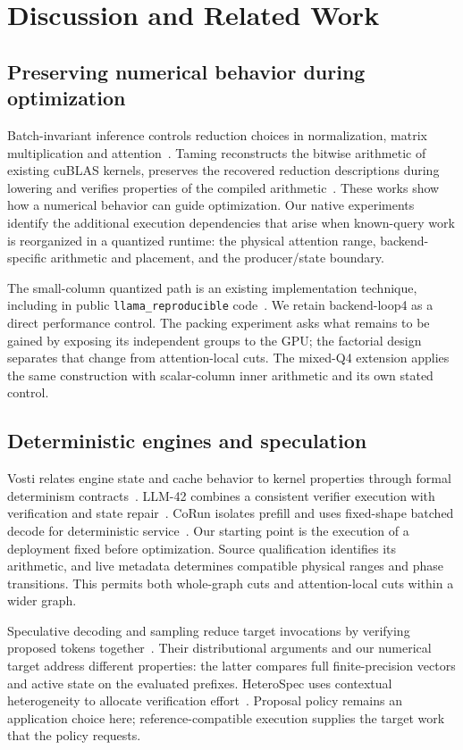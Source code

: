 \section{Discussion and Related Work}
\label{sec:related}
\subsection{Preserving numerical behavior during optimization}
Batch-invariant inference controls reduction choices in normalization, matrix multiplication and attention~\cite{thinkingmachines}. Taming reconstructs the bitwise arithmetic of existing cuBLAS kernels, preserves the recovered reduction descriptions during lowering and verifies properties of the compiled arithmetic~\cite{taming}. These works show how a numerical behavior can guide optimization. Our native experiments identify the additional execution dependencies that arise when known-query work is reorganized in a quantized runtime: the physical attention range, backend-specific arithmetic and placement, and the producer/state boundary.

The small-column quantized path is an existing implementation technique, including in public \texttt{llama\_reproducible} code~\cite{loop4code}. We retain backend-loop4 as a direct performance control. The packing experiment asks what remains to be gained by exposing its independent groups to the GPU; the factorial design separates that change from attention-local cuts. The mixed-Q4 extension applies the same construction with scalar-column inner arithmetic and its own stated control.

\subsection{Deterministic engines and speculation}
Vosti relates engine state and cache behavior to kernel properties through formal determinism contracts~\cite{vosti}. LLM-42 combines a consistent verifier execution with verification and state repair~\cite{llm42}. CoRun isolates prefill and uses fixed-shape batched decode for deterministic service~\cite{corun}. Our starting point is the execution of a deployment fixed before optimization. Source qualification identifies its arithmetic, and live metadata determines compatible physical ranges and phase transitions. This permits both whole-graph cuts and attention-local cuts within a wider graph.

Speculative decoding and sampling reduce target invocations by verifying proposed tokens together~\cite{leviathan2023,chen2023}. Their distributional arguments and our numerical target address different properties: the latter compares full finite-precision vectors and active state on the evaluated prefixes. HeteroSpec uses contextual heterogeneity to allocate verification effort~\cite{liu2026heterospec}. Proposal policy remains an application choice here; reference-compatible execution supplies the target work that the policy requests.

